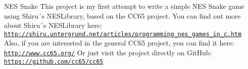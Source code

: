 N\+ES Snake This project is my first attempt to write a simple N\+ES Snake game using Shiru´s N\+E\+S\+Library, based on the C\+C65 project. You can find out more about Shiru´s N\+E\+S\+Library here\+: \href{http://shiru.untergrund.net/articles/programming_nes_games_in_c.htm}{\tt http\+://shiru.\+untergrund.\+net/articles/programming\+\_\+nes\+\_\+games\+\_\+in\+\_\+c.\+htm} Also, if you are interested in the general C\+C65 project, you can find it here\+: \href{http://www.cc65.org/}{\tt http\+://www.\+cc65.\+org/} Or just visit the project directly on Git\+Hub\+: \href{https://github.com/cc65/cc65}{\tt https\+://github.\+com/cc65/cc65} 